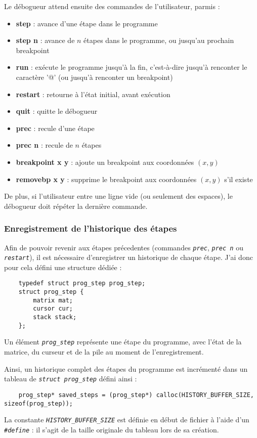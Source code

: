 \documentclass[a4paper,11pt]{article}
\newcommand{\code}[1]{{\itshape\lstinline{#1}}}
\begin{document}
\newpage
Le débogueur attend ensuite des commandes de l'utilisateur, parmis :
\renewcommand{\labelitemi}{\textbullet}
\begin{itemize}
    \item \textbf{step} : avance d'une étape dans le programme
    \item \textbf{step n} : avance de $n$ étapes dans le programme, ou jusqu'au prochain breakpoint
    \item \textbf{run} : exécute le programme jusqu'à la fin, c'est-à-dire jusqu'à renconter le caractère '@' (ou jusqu'à renconter un breakpoint)
    \item \textbf{restart} : retourne à l'état initial, avant exécution
    \item \textbf{quit} : quitte le débogueur
    \item \textbf{prec} : recule d'une étape
    \item \textbf{prec n} : recule de $n$ étapes
    \item \textbf{breakpoint x y} : ajoute un breakpoint aux coordonnées $(x, y)$
    \item \textbf{removebp x y} : supprime le breakpoint aux coordonnées $(x, y)$ s'il existe
\end{itemize}

De plus, si l'utilisateur entre une ligne vide (ou seulement des espaces), le débogueur doit répéter la dernière commande.

\subsubsection*{Enregistrement de l'historique des étapes}
Afin de pouvoir revenir aux étapes précedentes (commandes \code{prec}, \code{prec n} ou \code{restart}), il est nécessaire d'enregistrer un historique de chaque étape.
J'ai donc pour cela défini une structure dédiée :
\begin{lstlisting}
    typedef struct prog_step prog_step;
    struct prog_step {
        matrix mat;
        cursor cur;
        stack stack;
    };
\end{lstlisting}

Un élément \code{prog_step} représente une étape du programme, avec l'état de la matrice, du curseur et de la pile au moment de l'enregistrement.

Ainsi, un historique complet des étapes du programme est incrémenté dans un tableau de \code{struct prog_step} défini ainsi :
{\small\begin{lstlisting}
    prog_step* saved_steps = (prog_step*) calloc(HISTORY_BUFFER_SIZE, sizeof(prog_step));
\end{lstlisting}}
La constante \code{HISTORY_BUFFER_SIZE} est définie en début de fichier à l'aide d'un \code{#define} : il s'agit de la taille originale du tableau lors de sa création.
\end{document}
